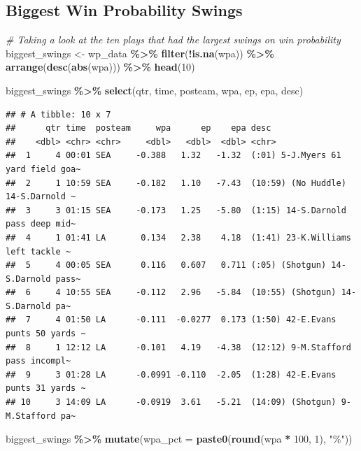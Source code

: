 \documentclass[
]{article}
\newenvironment{Shaded}{\begin{snugshade}}{\end{snugshade}}
\newcommand{\AttributeTok}[1]{\textcolor[rgb]{0.13,0.29,0.53}{#1}}
\newcommand{\CommentTok}[1]{\textcolor[rgb]{0.56,0.35,0.01}{\textit{#1}}}
\newcommand{\DecValTok}[1]{\textcolor[rgb]{0.00,0.00,0.81}{#1}}
\newcommand{\FunctionTok}[1]{\textcolor[rgb]{0.13,0.29,0.53}{\textbf{#1}}}
\newcommand{\NormalTok}[1]{#1}
\newcommand{\OtherTok}[1]{\textcolor[rgb]{0.56,0.35,0.01}{#1}}
\newcommand{\SpecialCharTok}[1]{\textcolor[rgb]{0.81,0.36,0.00}{\textbf{#1}}}
\newcommand{\StringTok}[1]{\textcolor[rgb]{0.31,0.60,0.02}{#1}}
\begin{document}
\subsection{Biggest Win Probability
Swings}\label{biggest-win-probability-swings}

\begin{Shaded}
\begin{Highlighting}[]
\CommentTok{\# Taking a look at the ten plays that had the largest swings on win probability }
\NormalTok{biggest\_swings }\OtherTok{\textless{}{-}}\NormalTok{ wp\_data }\SpecialCharTok{\%\textgreater{}\%}
  \FunctionTok{filter}\NormalTok{(}\SpecialCharTok{!}\FunctionTok{is.na}\NormalTok{(wpa)) }\SpecialCharTok{\%\textgreater{}\%}
  \FunctionTok{arrange}\NormalTok{(}\FunctionTok{desc}\NormalTok{(}\FunctionTok{abs}\NormalTok{(wpa))) }\SpecialCharTok{\%\textgreater{}\%}
  \FunctionTok{head}\NormalTok{(}\DecValTok{10}\NormalTok{)}

\NormalTok{biggest\_swings }\SpecialCharTok{\%\textgreater{}\%} \FunctionTok{select}\NormalTok{(qtr, time, posteam, wpa, ep, epa, desc)}
\end{Highlighting}
\end{Shaded}

\begin{verbatim}
## # A tibble: 10 x 7
##      qtr time  posteam     wpa      ep    epa desc                              
##    <dbl> <chr> <chr>     <dbl>   <dbl>  <dbl> <chr>                             
##  1     4 00:01 SEA     -0.388   1.32   -1.32  (:01) 5-J.Myers 61 yard field goa~
##  2     1 10:59 SEA     -0.182   1.10   -7.43  (10:59) (No Huddle) 14-S.Darnold ~
##  3     3 01:15 SEA     -0.173   1.25   -5.80  (1:15) 14-S.Darnold pass deep mid~
##  4     1 01:41 LA       0.134   2.38    4.18  (1:41) 23-K.Williams left tackle ~
##  5     4 00:05 SEA      0.116   0.607   0.711 (:05) (Shotgun) 14-S.Darnold pass~
##  6     4 10:55 SEA     -0.112   2.96   -5.84  (10:55) (Shotgun) 14-S.Darnold pa~
##  7     4 01:50 LA      -0.111  -0.0277  0.173 (1:50) 42-E.Evans punts 50 yards ~
##  8     1 12:12 LA      -0.101   4.19   -4.38  (12:12) 9-M.Stafford pass incompl~
##  9     3 01:28 LA      -0.0991 -0.110  -2.05  (1:28) 42-E.Evans punts 31 yards ~
## 10     3 14:09 LA      -0.0919  3.61   -5.21  (14:09) (Shotgun) 9-M.Stafford pa~
\end{verbatim}

\begin{Shaded}
\begin{Highlighting}[]
\NormalTok{biggest\_swings }\SpecialCharTok{\%\textgreater{}\%}
  \FunctionTok{mutate}\NormalTok{(}\AttributeTok{wpa\_pct =} \FunctionTok{paste0}\NormalTok{(}\FunctionTok{round}\NormalTok{(wpa }\SpecialCharTok{*} \DecValTok{100}\NormalTok{, }\DecValTok{1}\NormalTok{), }\StringTok{"\%"}\NormalTok{))}
\end{Highlighting}
\end{Shaded}
\end{document}
